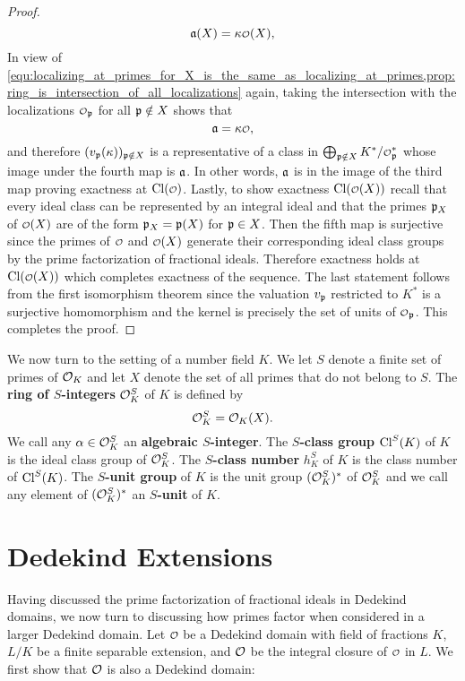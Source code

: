 \begin{proof}
      \[
        \mf{a}(X) = \k\smc{O}(X),
      \]
      In view of \cref{equ:localizing_at_primes_for_X_is_the_same_as_localizing_at_primes,prop:ring_is_intersection_of_all_localizations} again, taking the intersection with the localizations $\smc{O}_{\mf{p}}$ for all $\mathfrak{p} \notin X$ shows that
      \[
        \mf{a} = \k\smc{O},
      \]
      and therefore $(v_{\mathfrak{p}}(\kappa))_{\mathfrak{p} \notin X}$ is a representative of a class in $\bigop_{\mf{p} \notin X}K^{\ast}/\smc{O}_{\mf{p}}^{\ast}$ whose image under the fourth map is $\mathfrak{a}$. In other words, $\mathfrak{a}$ is in the image of the third map proving exactness at $\Cl(\smc{O})$. Lastly, to show exactness $\Cl(\smc{O}(X))$ recall that every ideal class can be represented by an integral ideal and that the primes $\mathfrak{p}_{X}$ of $\smc{O}(X)$ are of the form $\mathfrak{p}_{X} = \mathfrak{p}(X)$ for $\mathfrak{p} \in X$. Then the fifth map is surjective since the primes of $\smc{O}$ and $\smc{O}(X)$ generate their corresponding ideal class groups by the prime factorization of fractional ideals. Therefore exactness holds at $\Cl(\smc{O}(X))$ which completes exactness of the sequence. The last statement follows from the first isomorphism theorem since the valuation $v_{\mathfrak{p}}$ restricted to $K^{\ast}$ is a surjective homomorphism and the kernel is precisely the set of units of $\smc{O}_{\mf{p}}$. This completes the proof.
    \end{proof}

    We now turn to the setting of a number field $K$. We let $S$ denote a finite set of primes of $\mathcal{O}_{K}$ and let $X$ denote the set of all primes that do not belong to $S$. The \textbf{ring of $S$-integers} $\mathcal{O}_{K}^{S}$ of $K$ is defined by
    \[
      \mathcal{O}_{K}^{S} = \mathcal{O}_{K}(X).
    \]
    We call any $\alpha \in \mathcal{O}_{K}^{S}$ an \textbf{algebraic $S$-integer}. The \textbf{$S$-class group} $\operatorname{\mathrm{Cl}}^{S}(K)$ of $K$ is the ideal class group of $\mathcal{O}_{K}^{S}$. The \textbf{$S$-class number} $h_{K}^{S}$ of $K$ is the class number of $\operatorname{\mathrm{Cl}}^{S}(K)$. The \textbf{$S$-unit group} of $K$ is the unit group $(\mathcal{O}_{K}^{S})^{\ast}$ of $\mathcal{O}_{K}^{S}$ and we call any element of $(\mathcal{O}_{K}^{S})^{\ast}$ an \textbf{$S$-unit} of $K$.
  \section{Dedekind Extensions}
    Having discussed the prime factorization of fractional ideals in Dedekind domains, we now turn to discussing how primes factor when considered in a larger Dedekind domain. Let $\smc{O}$ be a Dedekind domain with field of fractions $K$, $L/K$ be a finite separable extension, and $\mathcal{O}$ be the integral closure of $\smc{O}$ in $L$. We first show that $\mathcal{O}$ is also a Dedekind domain:

